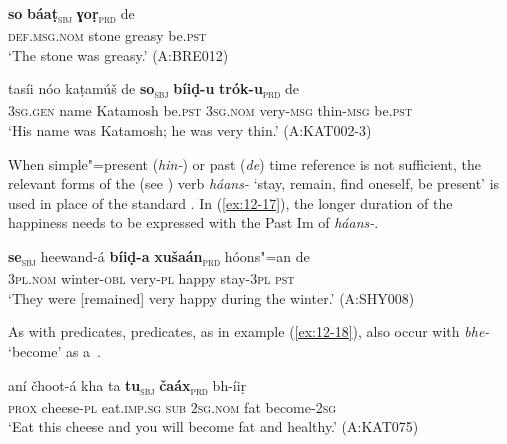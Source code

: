 \begin{exe}
\ex
\label{ex:12-15}
\gll {\ob}\textbf{so} \textbf{báaṭ}{\cb}\textsubscript{\textsc{\upshape sbj}} {\ob}\textbf{ɣoṛ}{\cb}\textsubscript{\textsc{\upshape prd}} de \\
\textsc{def.msg.nom} stone greasy be.\textsc{pst} \\
\glt `The stone was greasy.' (A:BRE012)
\end{exe}
\begin{exe}
\ex
\label{ex:12-16}
\gll tasíi nóo kaṭamúš de {\ob}\textbf{so}{\cb}\textsubscript{\textsc{\upshape sbj}} {\ob}\textbf{bíiḍ-u} \textbf{trók-u}{\cb}\textsubscript{\textsc{\upshape prd}} de\\
\textsc{3sg.gen} name Katamosh be.\textsc{pst} \textsc{3sg.nom} very-\textsc{msg} thin-\textsc{msg} be.\textsc{pst}\\
\glt `His name was Katamosh; he was very thin.' (A:KAT002-3)
\end{exe}

When simple"=present (\textit{hin-}) or past (\textit{de}) time reference is not sufficient, the relevant forms of the  (see ) verb \textit{háans-} `stay, remain, find oneself, be present' is used in place of the standard . In (\ref{ex:12-17}), the longer duration of the happiness needs to be expressed with the Past Im of \textit{háans-}.

\begin{exe}
\ex
\label{ex:12-17}
\gll {\ob}\textbf{se}{\cb}\textsubscript{\textsc{\upshape sbj}} heewand-á {\ob}\textbf{bíiḍ-a} \textbf{xušaán}{\cb}\textsubscript{\textsc{\upshape prd}} hóons"=an de \\
\textsc{3pl.nom} winter-\textsc{obl} very-\textsc{pl} happy stay-\textsc{3pl} \textsc{pst} \\
\glt `They were [remained] very happy during the winter.' (A:SHY008)
\end{exe}

As with   predicates,   predicates, as in example (\ref{ex:12-18}), also occur with \textit{bhe-} `become' as a~.

\begin{exe}
\ex
\label{ex:12-18}
\gll aní čhoot-á kha ta {\ob}\textbf{tu}{\cb}\textsubscript{\textsc{\upshape sbj}} {\ob}\textbf{čaáx}{\cb}\textsubscript{\textsc{\upshape prd}} bh-íiṛ \\
\textsc{prox} cheese-\textsc{pl} eat.\textsc{imp.sg} \textsc{sub} \textsc{2sg.nom} fat become-\textsc{2sg} \\
\glt `Eat this cheese and you will become fat and healthy.' (A:KAT075)
\end{exe}

